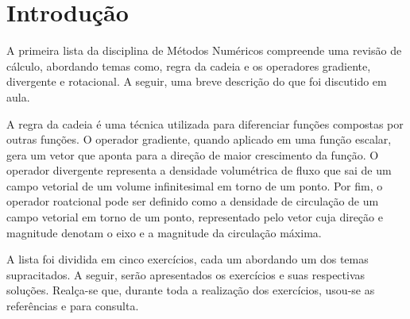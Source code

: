 \section{Introdu\c{c}\~{a}o} \label{sec:intro}
A primeira lista da disciplina de M\'etodos Num\'ericos compreende uma revis\~ao de c\'alculo, abordando temas como, regra da cadeia e os  operadores gradiente, divergente e rotacional. A seguir, uma breve descri\c{c}\~ao do que foi discutido em aula.

A regra da cadeia \'e uma t\'ecnica utilizada para diferenciar fun\c{c}\~oes compostas por outras fun\c{c}\~oes. O operador gradiente, quando aplicado em uma fun\c{c}\~ao escalar, gera um vetor que aponta para a dire\c{c}\~ao de maior crescimento da fun\c{c}\~ao. O operador divergente representa a densidade volum\'etrica de fluxo que sai de um campo vetorial de um volume infinitesimal em torno de um ponto. Por fim, o operador roatcional pode ser definido como a densidade de circula\c{c}\~ao de um campo vetorial em torno de um ponto, representado pelo vetor cuja dire\c{c}\~ao e magnitude denotam o eixo e a magnitude da circula\c{c}\~ao m\'axima.

A lista foi dividida em cinco exerc\'icios, cada um abordando um dos temas supracitados. A seguir, ser\~ao apresentados os exerc\'icios e suas respectivas solu\c{c}\~oes. Real\c{c}a-se que, durante toda a realiza\c{c}\~ao dos exerc\'icios, usou-se as refer\^encias \cite{stewart2007essential} e \cite{becker1981finite} para consulta.
